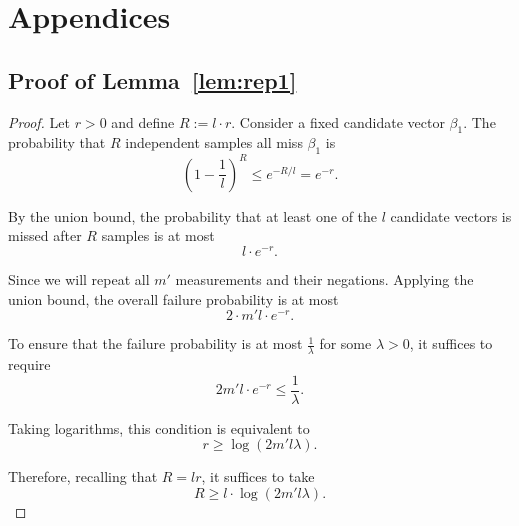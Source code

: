 \documentclass[10pt,a4paper]{amsart}
\newtheorem{lemma}{Lemma}[section]
\begin{document}





\section{Appendices}
\subsection{Proof of Lemma~\ref{lem:rep1}}
\begin{proof}
    Let $r > 0$ and define $R := l \cdot r$. Consider a fixed candidate vector $\beta_1$. The probability that $R$ independent samples all miss $\beta_1$ is
\[
\left(1 - \frac{1}{l}\right)^R \leq e^{-R/l} = e^{-r}.
\]

By the union bound, the probability that at least one of the $l$ candidate vectors is missed after $R$ samples is at most
\[
l \cdot e^{-r}.
\]

\medskip

Since we will repeat all $m'$ measurements and their negations. Applying the union bound, the overall failure probability is at most
\[
2\cdot m' l \cdot e^{-r}.
\]

\medskip

To ensure that the failure probability is at most $\frac{1}{\lambda}$ for some $\lambda > 0$, it suffices to require
\[
2m' l \cdot e^{-r} \leq \frac{1}{\lambda}.
\]

Taking logarithms, this condition is equivalent to
\[
r \geq \log(2m' l \lambda).
\]

Therefore, recalling that $R = l r$, it suffices to take
\[
R \geq l \cdot \log(2m' l \lambda).
\]
\end{proof}
\end{document}

